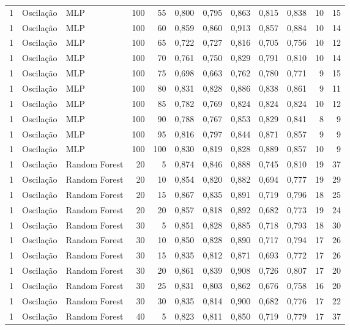 \begin{longtable}{@{}rllrrrrrrrrr@{}}
1 & Oscilação & MLP & 100 & 55 & 0,800 & 0,795 & 0,863 & 0,815 & 0,838 & 10 & 15 \\
1 & Oscilação & MLP & 100 & 60 & 0,859 & 0,860 & 0,913 & 0,857 & 0,884 & 10 & 14 \\
1 & Oscilação & MLP & 100 & 65 & 0,722 & 0,727 & 0,816 & 0,705 & 0,756 & 10 & 12 \\
1 & Oscilação & MLP & 100 & 70 & 0,761 & 0,750 & 0,829 & 0,791 & 0,810 & 10 & 14 \\
1 & Oscilação & MLP & 100 & 75 & 0,698 & 0,663 & 0,762 & 0,780 & 0,771 & 9 & 15 \\
1 & Oscilação & MLP & 100 & 80 & 0,831 & 0,828 & 0,886 & 0,838 & 0,861 & 9 & 11 \\
1 & Oscilação & MLP & 100 & 85 & 0,782 & 0,769 & 0,824 & 0,824 & 0,824 & 10 & 12 \\
1 & Oscilação & MLP & 100 & 90 & 0,788 & 0,767 & 0,853 & 0,829 & 0,841 & 8 & 9 \\
1 & Oscilação & MLP & 100 & 95 & 0,816 & 0,797 & 0,844 & 0,871 & 0,857 & 9 & 9 \\
1 & Oscilação & MLP & 100 & 100 & 0,830 & 0,819 & 0,828 & 0,889 & 0,857 & 10 & 9 \\
1 & Oscilação & Random Forest & 20 & 5 & 0,874 & 0,846 & 0,888 & 0,745 & 0,810 & 19 & 37 \\
1 & Oscilação & Random Forest & 20 & 10 & 0,854 & 0,820 & 0,882 & 0,694 & 0,777 & 19 & 29 \\
1 & Oscilação & Random Forest & 20 & 15 & 0,867 & 0,835 & 0,891 & 0,719 & 0,796 & 18 & 25 \\
1 & Oscilação & Random Forest & 20 & 20 & 0,857 & 0,818 & 0,892 & 0,682 & 0,773 & 19 & 24 \\
1 & Oscilação & Random Forest & 30 & 5 & 0,851 & 0,828 & 0,885 & 0,718 & 0,793 & 18 & 30 \\
1 & Oscilação & Random Forest & 30 & 10 & 0,850 & 0,828 & 0,890 & 0,717 & 0,794 & 17 & 26 \\
1 & Oscilação & Random Forest & 30 & 15 & 0,835 & 0,812 & 0,871 & 0,693 & 0,772 & 17 & 26 \\
1 & Oscilação & Random Forest & 30 & 20 & 0,861 & 0,839 & 0,908 & 0,726 & 0,807 & 17 & 20 \\
1 & Oscilação & Random Forest & 30 & 25 & 0,831 & 0,803 & 0,862 & 0,676 & 0,758 & 16 & 20 \\
1 & Oscilação & Random Forest & 30 & 30 & 0,835 & 0,814 & 0,900 & 0,682 & 0,776 & 17 & 22 \\
1 & Oscilação & Random Forest & 40 & 5 & 0,823 & 0,811 & 0,850 & 0,719 & 0,779 & 17 & 37 \\

\end{longtable}
